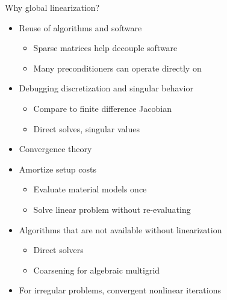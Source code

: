 \documentclass{beamer}
\begin{document}
\begin{frame}{Why global linearization?}
  \begin{itemize}
  \item Reuse of algorithms and software
    \begin{itemize}
    \item Sparse matrices help decouple software
    \item Many preconditioners can operate directly on 
    \end{itemize}
  \item Debugging discretization and singular behavior
    \begin{itemize}
    \item Compare to finite difference Jacobian
    \item Direct solves, singular values
    \end{itemize}
  \item Convergence theory
  \item Amortize setup costs
    \begin{itemize}
    \item Evaluate material models once
    \item Solve linear problem without re-evaluating
    \end{itemize}
  \item Algorithms that are not available without linearization
    \begin{itemize}
    \item Direct solvers
    \item Coarsening for algebraic multigrid
    \end{itemize}
  \item For irregular problems, convergent nonlinear iterations 
  \end{itemize}
\end{frame}
\end{document}
